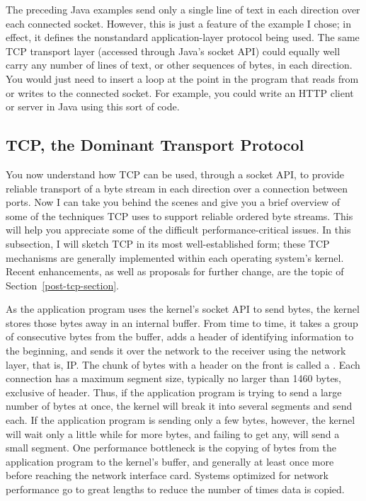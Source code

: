 The preceding Java examples send only a single line of text in each
direction over each connected socket.  However, this is just a feature
of the example I chose; in effect, it defines the nonstandard
application-layer protocol being used.  The same TCP transport layer
(accessed through Java's socket API) could equally well carry any
number of lines of text, or other sequences of bytes, in each
direction.  You would just need to insert a loop at the point in the
program that reads from or writes to the connected socket.
For example, you could write an HTTP client or server in Java using
this sort of code.

\subsection{TCP, the Dominant Transport Protocol}\label{tcp-section}

You now understand how TCP can be used, through a socket API, to
provide reliable transport of a byte stream in each direction over a
connection between ports.  Now I can take you behind the scenes and
give you a brief overview of some of the techniques TCP uses to
support reliable ordered byte streams.  This will help you appreciate
some of the difficult performance-critical issues.  In this
subsection, I will sketch TCP in its most well-established form; these
TCP mechanisms are generally implemented within each operating system's kernel.
Recent enhancements, as well as proposals for further change, are the
topic of Section~\ref{post-tcp-section}.

As the application program uses the kernel's socket API to send bytes,
the kernel stores those bytes away in an internal buffer.  From time
to time, it takes a group of consecutive bytes from the buffer, adds a
header of identifying information to the beginning, and sends it over
the network to the receiver using the network layer, that is, IP.
The chunk of bytes with a header on the front is called a
.  Each connection has a maximum segment size,
typically no larger than 1460 bytes, exclusive of header.  Thus, if the application program
is trying to send a large number of bytes at once, the kernel will
break it into several segments and send each.  If the application
program is sending only a few bytes, however, the kernel will wait
only a little while for more bytes, and failing to get any, will send
a small segment.  One
performance bottleneck is the copying of bytes from the application
program to the kernel's buffer, and generally at least once more
before reaching the network interface card.  Systems optimized for
network performance go to great lengths to reduce the number of times
data is copied.

